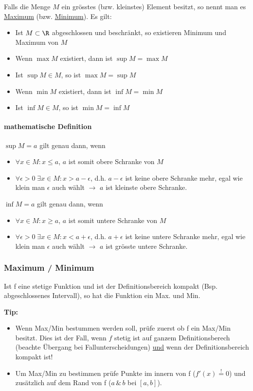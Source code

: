 Falls die Menge $M$ ein grösstes (bzw. kleinstes) Element besitzt, so nennt man es \underline{Maximum} (bzw. \underline{Minimum}).
Es gilt:
\begin{itemize}
	\item Ist $M \subset \R$ abgeschlossen und beschränkt, so existieren Minimum und Maximum von $M$
	\item Wenn $\max M$ existiert, dann ist $\sup M = \max M$
	\item Ist $\sup M \in M$, so ist $\max M = \sup M$
	\item Wenn $\min M$ existiert, dann ist $\inf M = \min M$
	\item Ist $\inf M \in M$, so ist $\min M = \inf M$
\end{itemize}

\paragraph{mathematische Definition}
$\sup M = a$ gilt genau dann, wenn
\begin{itemize}
	\item $\forall x \in M: x \leq a$, $a$ ist somit obere Schranke von $M$
	\item $\forall \epsilon > 0 \; \exists x \in M: x > a - \epsilon$, d.h. $a - \epsilon$ ist keine obere Schranke mehr, egal wie klein man $\epsilon$ auch wählt $\rightarrow$ $a$ ist kleinste obere Schranke.
\end{itemize}

$\inf M = a$ gilt genau dann, wenn
\begin{itemize}
	\item $\forall x \in M: x \geq a$, $a$ ist somit untere Schranke von $M$
	\item $\forall \epsilon > 0 \; \exists x \in M: x < a + \epsilon$, d.h. $a + \epsilon$ ist keine untere Schranke mehr, egal wie klein man $\epsilon$ auch wählt $\rightarrow$ $a$ ist grösste untere Schranke.
\end{itemize}

\subsubsection{Maximum / Minimum} 
\begin{satz} Ist f eine stetige Funktion und ist der Definitionsbereich kompakt (Bsp. abgeschlossenes Intervall), so hat die Funktion ein Max. und Min.
\end{satz}
{\small
\textbf{Tip:} 
\begin{itemize}
	\item Wenn Max/Min bestummen werden soll, prüfe zuerst ob f ein Max/Min besitzt. Dies ist der Fall, wenn $f$ stetig ist auf ganzem Definitionsberech (beachte Übergang bei Fallunterscheidungen) \underline{und} wenn der Definitionsbereich kompakt ist!

	\item Um Max/Min zu bestimmen prüfe Punkte im innern von f ($f'(x) \overset{!}{=} 0$) und zusätzlich auf dem Rand von f ($a \, \& \, b$ bei $[a, b]$).
\end{itemize}}

